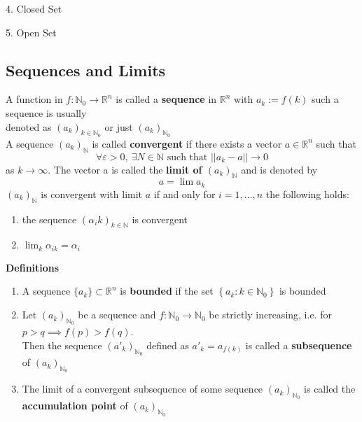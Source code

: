 \documentclass{article}
\begin{document}
    \vspace{50mm}
    4. Closed Set
    \begin{center}
\end{center}
    \vspace{5mm}
    5. Open Set
    \begin{center}
\end{center} \vspace{10mm}
\subsection{Sequences and Limits}
A function in $f : \mathbb{N}_{0} \rightarrow \mathbb{R}^n$ is called a \textbf{sequence} in $\mathbb{R}^{n}$ with $a_k := f(k)$ such a sequence is usually \\ denoted as $(a_k)_{k \in \mathbb{N}_{0}}$ or just $(a_k)_{\mathbb{N}_{0}}$ 
\\
A sequence $(a_k)_{\mathbb{N}}$ is called \textbf{convergent} if there exists a vector $a \in \mathbb{R}^n$ such that
\[
\forall \varepsilon > 0, \ \exists N \in \mathbb{N} \text{ such that } ||a_k - a|| \rightarrow 0 
\]
as $k \rightarrow \infty$. The vector a is called the \textbf{limit of $(a_k)_{\mathbb{N}}$} and is denoted by \begin{equation*} a = \lim a_k\end{equation*}
$(a_k)_{\mathbb{N}}$ is convergent with limit $a$ if and only for $i = 1, \dots, n$ the following holds:
\begin{enumerate}
    \item the sequence $(\alpha_ik)_{k \in \mathbb{N}}$ is convergent
    \item $\lim_{k} \alpha_{ik} = \alpha_{i}$
\end{enumerate} \newpage
\textbf{Definitions}
\begin{enumerate}
\item A sequence $\{a_k\} \subset \mathbb{R}^n$ is \textbf{bounded} if the set $\left\{a_k : k \in \mathbb{N}_{0}\right\}$ is bounded
\item Let $(a_k)_{\mathbb{N}_{0}}$ be a sequence and $f : \mathbb{N}_{0} \rightarrow \mathbb{N}_{0}$ be strictly increasing, i.e. for $p > q \implies f(p) > f(q)$. \\ Then the sequence $(a'_k)_{\mathbb{N}_{0}}$ defined as $a'_k = a_{f(k)}$ is called a \textbf{subsequence} of $(a_k)_{\mathbb{N}_{0}}$ 
\item The limit of a convergent subsequence of some sequence $(a_k)_{\mathbb{N}_{0}}$ is called the \textbf{accumulation point} of $(a_k)_{\mathbb{N}_{0}}$ 
\end{enumerate}
\end{document}
